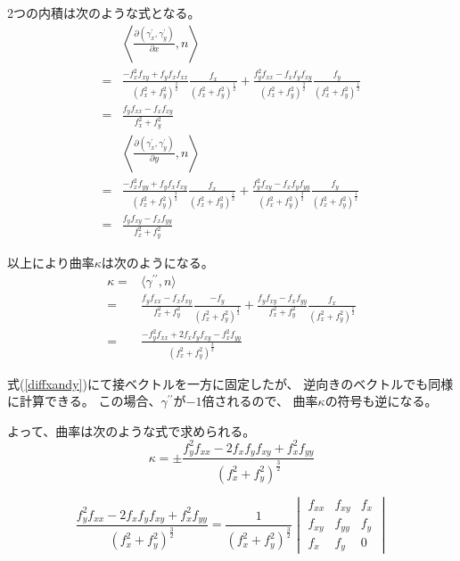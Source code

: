\documentclass[12pt,b5paper]{ltjsarticle}
\begin{document}
\begin{enumerate}
      2つの内積は次のような式となる。
      \begin{align}
       &
       \left\langle
       \frac{\partial (\gamma_{x}^{\prime},\gamma_{y}^{\prime})}{\partial x},n \right\rangle\\
       =& \frac{-f_{x}^2f_{xy} + f_{y}f_{x}f_{xx}}{(f_{x}^2+f_{y}^2)^\frac{3}{2}}
       \frac{f_{x}}{(f_{x}^2+f_{y}^2)^\frac{1}{2}}
       +\frac{f_{y}^2 f_{xx}-f_{x}f_{y}f_{xy}}{(f_{x}^2+f_{y}^2)^\frac{3}{2}}
       \frac{f_{y}}{(f_{x}^2+f_{y}^2)^\frac{1}{2}}\\
       =& \frac{f_{y} f_{xx}-f_{x}f_{xy}}{f_{x}^2+f_{y}^2}\\
%
       &
       \left\langle
       \frac{\partial (\gamma_{x}^{\prime},\gamma_{y}^{\prime})}{\partial y},n \right\rangle\\
       =& \frac{-f_{x}^2f_{yy} + f_{y}f_{x}f_{xy}}{(f_{x}^2+f_{y}^2)^\frac{3}{2}}
       \frac{f_{x}}{(f_{x}^2+f_{y}^2)^\frac{1}{2}}
       +\frac{f_{y}^2 f_{xy}-f_{x}f_{y}f_{yy}}{(f_{x}^2+f_{y}^2)^\frac{3}{2}}
       \frac{f_{y}}{(f_{x}^2+f_{y}^2)^\frac{1}{2}}\\
       =& \frac{f_{y} f_{xy}-f_{x}f_{yy}}{f_{x}^2+f_{y}^2}
      \end{align}

      以上により曲率$\kappa$は次のようになる。
      \begin{align}
       \kappa =& \langle \gamma^{\prime\prime}, n\rangle\\
       =&
       \frac{f_{y} f_{xx}-f_{x}f_{xy}}{f_{x}^2+f_{y}^2}
       \frac{-f_{y}}{(f_{x}^2+f_{y}^2)^\frac{1}{2}}
       +
       \frac{f_{y} f_{xy}-f_{x}f_{yy}}{f_{x}^2+f_{y}^2}
       \frac{f_{x}}{(f_{x}^2+f_{y}^2)^\frac{1}{2}}\\
       =&
       \frac{-f_y^2f_{xx}+2f_xf_yf_{xy}-f_x^2f_{yy}}{(f_x^2+f_y^2)^{\frac{3}{2}}}
      \end{align}

      式(\ref{diffxandy})にて接ベクトルを一方に固定したが、
      逆向きのベクトルでも同様に計算できる。
      この場合、$\gamma^{\prime\prime}$が$-1$倍されるので、
      曲率$\kappa$の符号も逆になる。

      よって、曲率は次のような式で求められる。
      \begin{equation}
       \kappa=
       \pm
       \frac{f_y^2f_{xx}-2f_xf_yf_{xy}+f_x^2f_{yy}}{(f_x^2+f_y^2)^{\frac{3}{2}}}
      \end{equation}

      \dotfill

      \begin{equation}
       \frac{f_y^2f_{xx}-2f_xf_yf_{xy}+f_x^2f_{yy}}{(f_x^2+f_y^2)^{\frac{3}{2}}}
        =
        \frac{1}{(f_x^2+f_y^2)^{\frac{3}{2}}}
        \begin{vmatrix}
         f_{xx} & f_{xy} & f_{x}\\
         f_{xy} & f_{yy} & f_{y}\\
         f_{x} & f_{y} & 0
        \end{vmatrix}
      \end{equation}
\end{enumerate}

\hrulefill
\end{document}
